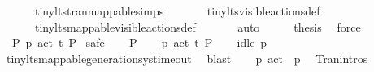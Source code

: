 \begin{isabellebody}
\ \ \ \ \ \ tiny{\isacharunderscore}{\kern0pt}lts{\isachardot}{\kern0pt}tran{\isacharunderscore}{\kern0pt}mappable{\isachardot}{\kern0pt}simps\ \isanewline
\ \ \ \ \ \ tiny{\isacharunderscore}{\kern0pt}lts{\isachardot}{\kern0pt}visible{\isacharunderscore}{\kern0pt}actions{\isacharunderscore}{\kern0pt}def\ \isanewline
\ \ \ \ \ \ tiny{\isacharunderscore}{\kern0pt}lts{\isacharunderscore}{\kern0pt}mappable{\isachardot}{\kern0pt}visible{\isacharunderscore}{\kern0pt}actions{\isacharunderscore}{\kern0pt}def\ \isanewline
\ \ \ \ \isamarkupfalse%
\ auto\isanewline
\ \ \isamarkupfalse%
\ \isamarkupfalse%
\ {\isacharquery}{\kern0pt}thesis\ \isamarkupfalse%
\ force\isanewline
{}\isamarkupfalse%
\isanewline
\isanewline
{}\isamarkupfalse%
\ {\isacartoucheopen}{\isasymnexists}\ P{\isacharprime}{\kern0pt}{\isachardot}{\kern0pt}\ {\isasymtheta}{\isacharbrackleft}{\kern0pt}{\isasymemptyset}{\isacharbrackright}{\kern0pt}{\isacharparenleft}{\kern0pt}p{}{\isacharparenright}{\kern0pt}\ {\isasymlongmapsto}\isactrlsup {\isasymtheta}{\isacharparenleft}{\kern0pt}act\ t{\isacharparenright}{\kern0pt}\ P{\isacharprime}{\kern0pt}{\isacartoucheclose}\isanewline
{}\isamarkupfalse%
\ safe\isanewline
\ \ \isamarkupfalse%
\ P{\isacharprime}{\kern0pt}\isanewline
\ \ \isamarkupfalse%
\ {\isacartoucheopen}{\isasymtheta}{\isacharbrackleft}{\kern0pt}{\isasymemptyset}{\isacharbrackright}{\kern0pt}{\isacharparenleft}{\kern0pt}p{}{\isacharparenright}{\kern0pt}\ {\isasymlongmapsto}\isactrlsup {\isasymtheta}{\isacharparenleft}{\kern0pt}act\ t{\isacharparenright}{\kern0pt}\ P{\isacharprime}{\kern0pt}{\isacartoucheclose}\isanewline
\ \ \isamarkupfalse%
\ {\isacartoucheopen}idle\ p{}\ {\isasymemptyset}{\isacartoucheclose}\ \isanewline
\ \ \ \ \isamarkupfalse%
\ tiny{\isacharunderscore}{\kern0pt}lts{\isacharunderscore}{\kern0pt}mappable{\isachardot}{\kern0pt}generation{\isacharunderscore}{\kern0pt}sys{\isacharunderscore}{\kern0pt}timeout\ \isamarkupfalse%
\ blast\isanewline
\isanewline
\ \ \isamarkupfalse%
\ {\isacartoucheopen}p{}\ {\isasymlongmapsto}{\isacharparenleft}{\kern0pt}act\ {\isasymtau}{\isacharparenright}{\kern0pt}\ p{}{\isacartoucheclose}\ \isamarkupfalse%
\ Tran{\isachardot}{\kern0pt}intros{\isacharparenleft}{\kern0pt}{}{\isacharparenright}{\kern0pt}\isanewline
\ \ \ \ \isamarkupfalse%

\end{isabellebody}
